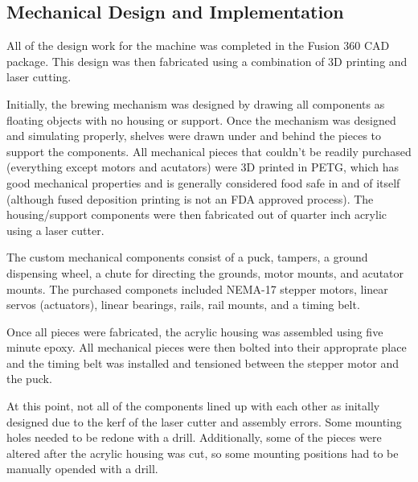 \documentclass[conference]{IEEEtran}
\begin{document}
\subsection{Mechanical Design and Implementation}
All of the design work for the machine was completed in the Fusion 360 CAD
package. This design was then fabricated using a combination of 3D printing and
laser cutting. 

Initially, the brewing mechanism was designed by drawing all components as
floating objects with no housing or support. Once the mechanism was designed and
simulating properly, shelves were drawn under and behind the pieces to support
the components. All mechanical pieces that couldn't be readily purchased
(everything except motors and acutators) were 3D printed in PETG, which has good
mechanical properties and is generally considered food safe in and of itself
(although fused deposition printing is not an FDA approved process). The
housing/support components were then fabricated out of quarter inch acrylic using a laser cutter.

The custom mechanical components consist of a puck, tampers, a ground dispensing
wheel, a chute for directing the grounds, motor mounts, and acutator mounts. The
purchased componets included NEMA-17 stepper motors, linear servos (actuators),
linear bearings, rails, rail mounts, and a timing belt.

Once all pieces were fabricated, the acrylic housing was assembled using five
minute epoxy. All mechanical pieces were then bolted into their approprate place
and the timing belt was installed and tensioned between the stepper motor and
the puck.

At this point, not all of the components lined up with each other as initally
designed due to the kerf of the laser cutter and assembly errors. Some mounting
holes needed to be redone with a drill. Additionally, some of the pieces were
altered after the acrylic housing was cut, so some mounting positions had to be
manually opended with a drill.
\end{document}
